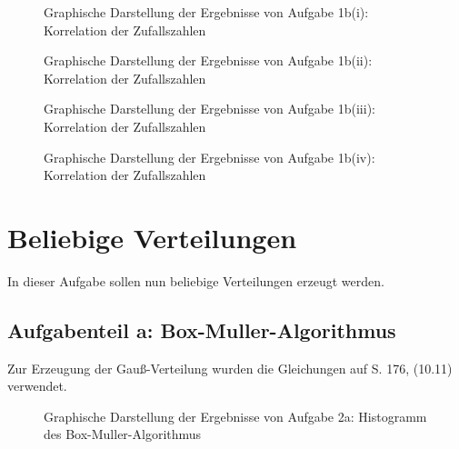 \begin{landscape}
	\begin{figure}
		\caption{Graphische Darstellung der Ergebnisse von Aufgabe 1b(i): Korrelation der Zufallszahlen}
		\label{fig:1b1korr}
	\end{figure}
\end{landscape}

\begin{landscape}
	\begin{figure}
		\caption{Graphische Darstellung der Ergebnisse von Aufgabe 1b(ii): Korrelation der Zufallszahlen}
		\label{fig:1b2korr}
	\end{figure}
\end{landscape}


\begin{landscape}
	\begin{figure}
		\caption{Graphische Darstellung der Ergebnisse von Aufgabe 1b(iii): Korrelation der Zufallszahlen}
		\label{fig:1b3korr}
	\end{figure}
\end{landscape}


\begin{landscape}
	\begin{figure}
		\caption{Graphische Darstellung der Ergebnisse von Aufgabe 1b(iv): Korrelation der Zufallszahlen}
		\label{fig:1b4korr}
	\end{figure}
\end{landscape}

\section*{Beliebige Verteilungen}
In dieser Aufgabe sollen nun beliebige Verteilungen erzeugt werden.
\subsection*{Aufgabenteil a: Box-Muller-Algorithmus}
Zur Erzeugung der Gauß-Verteilung wurden die Gleichungen auf S. 176, (10.11) verwendet.

\begin{landscape}
	\begin{figure}
		\caption{Graphische Darstellung der Ergebnisse von Aufgabe 2a: Histogramm des Box-Muller-Algorithmus}
		\label{fig:2a}
	\end{figure}
\end{landscape}

